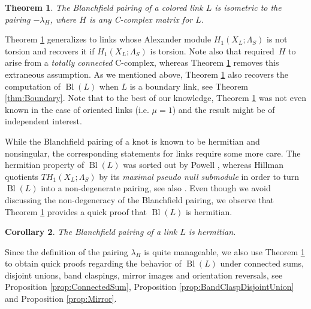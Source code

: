 \documentclass[11pt,a4paper]{amsart}
\newtheorem{theorem}{Theorem}[section]
\newtheorem{corollary}[theorem]{Corollary}
\theoremstyle{definition}
\def\op{\operatorname}
\begin{document}
\begin{theorem}
\label{thm:main}
The Blanchfield pairing of a colored link $L$ is isometric to the pairing $-\lambda_H$, where $H$  is any C-complex matrix for $L$.
\end{theorem}

Theorem \ref{thm:main} generalizes \cite[Theorem 1.1]{ConwayFriedlToffoli} to links whose Alexander module $H_1(X_L;\Lambda_S)$ is not torsion and recovers it if $H_1(X_L;\Lambda_S)$ is torsion. Note also that \cite[Theorem 1.1]{ConwayFriedlToffoli} required~$H$ to arise from a \emph{totally connected} C-complex, whereas Theorem \ref{thm:main} removes this extraneous assumption.  As we mentioned above, Theorem \ref{thm:main} also recovers the computation of $\op{Bl}(L)$ when $L$ is a boundary link, see Theorem \ref{thm:Boundary}. Note that to the best of our knowledge, Theorem \ref{thm:main} was not even  known in the case of oriented links (i.e. $\mu=1$) and the result might be of independent interest.

\medskip
While the Blanchfield pairing of a knot is known to be hermitian and nonsingular, the corresponding statements for links require some more care. The hermitian property of $\op{Bl}(L)$ was sorted out by Powell \cite{Powell}, whereas Hillman \cite{Hillman} quotients $TH_1(X_L;\Lambda_S)$ by its \emph{maximal pseudo null submodule} in order to turn $\op{Bl}(L)$ into a non-degenerate pairing, see also \cite[Section 2.5]{BorodzikFriedlPowell}. Even though we avoid discussing the non-degeneracy of the Blanchfield pairing, we observe that Theorem \ref{thm:main} provides a quick proof that $\op{Bl}(L)$ is hermitian. 

\begin{corollary}
\label{cor:NonSingular}
The Blanchfield pairing of a link $L$ is hermitian.
 \end{corollary}

Since the definition of the pairing $\lambda_H$ is quite manageable, we also use Theorem \ref{thm:main} to obtain quick proofs regarding the behavior of $\op{Bl}(L)$ under connected sums, disjoint unions, band claspings, mirror images and orientation reversals, see Proposition \ref{prop:ConnectedSum}, Proposition \ref{prop:BandClaspDisjointUnion} and Proposition \ref{prop:Mirror}. 
\end{document}
